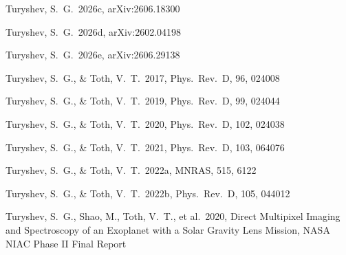 \documentclass[twocolumn,10pt]{article}
\begin{document}
\begin{thebibliography}{}
Turyshev, S.~G.\ 2026c, arXiv:2606.18300

Turyshev, S.~G.\ 2026d, arXiv:2602.04198

Turyshev, S.~G.\ 2026e, arXiv:2606.29138

Turyshev, S.~G., \& Toth, V.~T.\ 2017, Phys.\ Rev.\ D, 96, 024008

Turyshev, S.~G., \& Toth, V.~T.\ 2019, Phys.\ Rev.\ D, 99, 024044

Turyshev, S.~G., \& Toth, V.~T.\ 2020, Phys.\ Rev.\ D, 102, 024038

Turyshev, S.~G., \& Toth, V.~T.\ 2021, Phys.\ Rev.\ D, 103, 064076

Turyshev, S.~G., \& Toth, V.~T.\ 2022a, MNRAS, 515, 6122

Turyshev, S.~G., \& Toth, V.~T.\ 2022b, Phys.\ Rev.\ D, 105, 044012

Turyshev, S.~G., Shao, M., Toth, V.~T., et al.\ 2020, Direct Multipixel Imaging and Spectroscopy of an Exoplanet with a Solar Gravity Lens Mission, NASA NIAC Phase II Final Report

\end{thebibliography}
\end{document}
